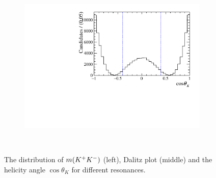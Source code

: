 \begin{figure}[!ht]
\begin{subfigure}[t]{0.32\textwidth}
        \includegraphics[width=1.0\textwidth]{figs/B2DsPhi/a2_1320_Helicity.pdf}
    \end{subfigure}\\



    \caption{The distribution of $m({{K}^+}{{K}^-})$ (left), Dalitz plot (middle) and the helicity angle $\cos\theta_{K}$ for different resonances.} 
    \label{fig:model_two}   
\end{figure}



